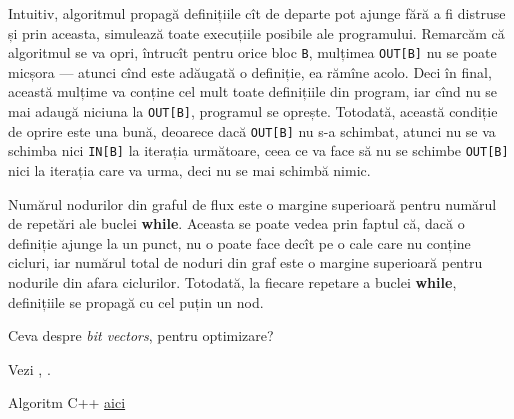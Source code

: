 Intuitiv, algoritmul propagă definițiile cît de departe pot ajunge fără a fi
distruse și prin aceasta, simulează toate execuțiile posibile ale programului.
Remarcăm că algoritmul se va opri, întrucît pentru orice bloc \texttt{B},
mulțimea \texttt{OUT[B]} nu se poate micșora --- atunci cînd este adăugată
o definiție, ea rămîne acolo. Deci în final, această mulțime va conține
cel mult toate definițiile din program, iar cînd nu se mai adaugă niciuna
la \texttt{OUT[B]}, programul se oprește. Totodată, această condiție de
oprire este una bună, deoarece dacă \texttt{OUT[B]} nu s-a schimbat,
atunci nu se va schimba nici \texttt{IN[B]} la iterația următoare,
ceea ce va face să nu se schimbe \texttt{OUT[B]} nici la iterația care
va urma, deci nu se mai schimbă nimic.

Numărul nodurilor din graful de flux este o margine superioară pentru numărul
de repetări ale buclei \textbf{while}. Aceasta se poate vedea prin faptul
că, dacă o definiție ajunge la un punct, nu o poate face decît pe o cale
care nu conține cicluri, iar numărul total de noduri din graf este o margine
superioară pentru nodurile din afara ciclurilor. Totodată, la fiecare
repetare a buclei \textbf{while}, definițiile se propagă cu cel puțin un
nod.

{\color{red}
  Ceva despre \emph{bit vectors}, pentru optimizare?

  Vezi \cite[p.~607]{aho}, \cite[\S 8.1]{much}.

  Algoritm C++ \href{https://github.com/bhumbers/optcomp/blob/master/asst2/ClassicalDataflow/reaching-definitions.cpp}{aici}
}




